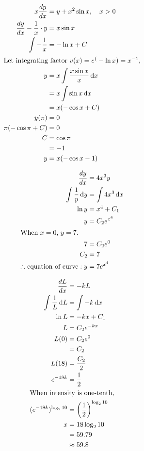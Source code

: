 \documentclass[12pt]{article}
\newcommand*\diff{\mathop{}\!\mathrm{d}}
\newenvironment{problem}[2][Problem]{\begin{trivlist}
\item[\hskip \labelsep {\bfseries #1}\hskip \labelsep {\bfseries #2.}]}{\end{trivlist}}
\begin{document}
\begin{problem}{2.b}
\end{problem}
\begin{align*}
x\frac{dy}{dx} &= y + x^2\sin x, \quad x>0\\
\frac{dy}{dx} - \frac{1}{x}\cdot y &= x\sin x\\
\int -\frac{1}{x} &= -\ln x + C\\
\intertext{Let integrating factor $v(x) = e^(-\ln x) =x^{-1}$,}
y &= x \int \frac{x\sin x}{x} \diff x\\
&= x \int \sin x \diff x\\
&= x (-\cos x + C)\\
y(\pi) &= 0\\
\pi (-\cos \pi + C) &= 0\\
C &= \cos \pi\\
&= -1\\
y &= x (-\cos x - 1)\\
\end{align*}
\filbreak

\begin{problem}{3}
\end{problem}
\begin{align*}
\frac{dy}{dx} &= 4x^3y\\
\int \frac{1}{y} \diff y &= \int 4x^3\diff x\\
\ln y &= x^4 + C_1\\
y &= C_2 e^{x^4}\\
\intertext{When $x = 0$, $ y = 7$.}
7 &= C_2 e^0\\
C_2 &= 7\\
\text{$\therefore$ equation of curve}:y &= 7e^{x^4}
\end{align*}
\filbreak

\begin{problem}{5}
\end{problem}
\begin{align*}
\frac{dL}{dx} &= -kL\\
\int \frac{1}{L} \diff L &= \int -k \diff x\\
\ln L &= -kx + C_1\\
L &= C_2e^{-kx}\\
L(0) &= C_2e^0\\
&= C_2 \\
L(18) &= \frac{C_2}{2}\\
e^{-18k} &= \frac{1}{2}\\
\intertext{When intensity is one-tenth,}
(e^{-18k})^{\log_2 10} &= \left( \frac{1}{2} \right)^{\log_2 10}\\
x &= 18 \log_2 10\\ 
&= 59.79\\
&\approx 59.8
\end{align*}
\filbreak
\end{document}
